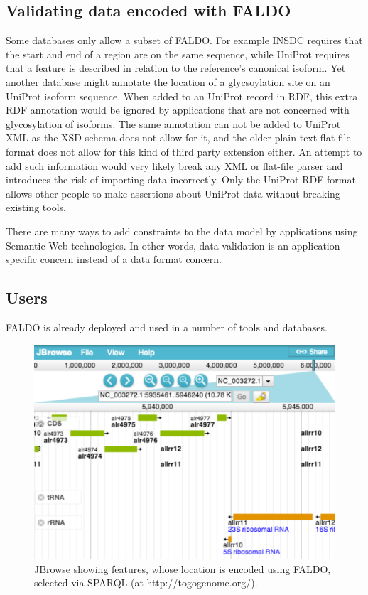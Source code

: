 \subsection*{Validating data encoded with FALDO}

Some databases only allow a subset of FALDO. 
For example INSDC requires that the start and end of a region are on the same sequence,
while UniProt requires that a feature is described in relation to the reference's canonical isoform.
Yet another database might annotate the location of a glycsoylation site on an UniProt isoform sequence.
When added to an UniProt record in RDF, this extra RDF annotation would be ignored by applications that are not concerned with glycosylation of isoforms.
The same annotation can not be added to UniProt XML as the XSD schema does not allow for it,
and the older plain text flat-file format does not allow for this kind of third party extension either.
An attempt to add such information would very likely break any XML or flat-file parser and introduces the risk of importing data incorrectly.
Only the UniProt RDF format allows other people to make assertions about UniProt data without breaking existing tools.

There are many ways to add constraints to the data model by applications using Semantic Web technologies\cite{RDFValidationReport}.
In other words, data validation is an application specific concern instead of a data format concern.

\subsection*{Users}
FALDO is already deployed and used in a number of tools and databases.


\begin{figure}
\begin{center}
\includegraphics[width=17cm]{figures/togogenomes.pdf}
\end{center}
\caption{JBrowse showing features, whose location is encoded using FALDO, selected via SPARQL (at http://togogenome.org/). }
\label{fig:jbrowse}
\end{figure}

